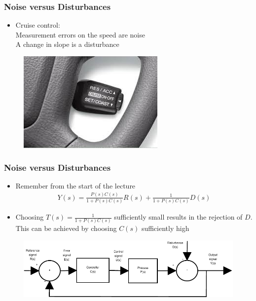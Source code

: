 \begin{frame}
	\frametitle{Noise versus Disturbances}
	\begin{itemize}
		\item Cruise control: \\
		Measurement errors on the speed are noise \\
		A change in slope is a disturbance
	\end{itemize}
	\begin{figure}
\centering
\includegraphics[width=0.7\linewidth]{"cruise control"}
\label{fig:cruisecontrol}
\end{figure}
\end{frame}

\begin{frame}
	\frametitle{Noise versus Disturbances}
	\begin{itemize}
		\item Remember from the start of the lecture
		\begin{align*}
			Y(s) = \frac{P(s)C(s)}{1+P(s)C(s)}R(s) + \frac{1}{1+P(s)C(s)}D(s)
		\end{align*}
		\item Choosing $T(s)=\frac{1}{1+P(s)C(s)}$ sufficiently small results in the rejection of $D$. This can be achieved by choosing $C(s)$ sufficiently high
	\end{itemize}
	\begin{figure}
\centering
\includegraphics[width=0.7\linewidth]{Closed-Loop}
\label{fig:Closed-Loop4}
\end{figure}
\end{frame}


